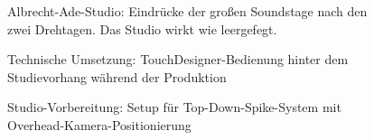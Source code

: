 \FloatBarrier
\begin{figure}[htbp]
    \centering
    \caption{Albrecht-Ade-Studio: Eindrücke der großen Soundstage nach den zwei Drehtagen. Das Studio wirkt wie leergefegt.}
    \label{fig:studio_interior}
\end{figure}

\begin{figure}[htbp]
    \centering
    \caption{Technische Umsetzung: TouchDesigner-Bedienung hinter dem Studievorhang während der Produktion}
    \label{fig:technical_operation}
\end{figure}

\begin{figure}[htbp]
    \centering
    \caption{Studio-Vorbereitung: Setup für Top-Down-Spike-System mit Overhead-Kamera-Positionierung}
    \label{fig:topdown_setup}
\end{figure}

